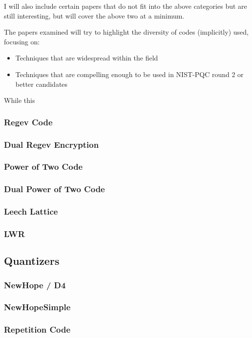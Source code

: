 \documentclass{article}
\begin{document}
I will also include certain papers that do not fit into the above categories but are still interesting, but will cover the above two at a minimum.



The papers examined will try to highlight the diversity of codes (implicitly) used, focusing on:
\begin{itemize}
	\item Techniques that are widespread within the field
	\item Techniques that are compelling enough to be used in NIST-PQC round 2 or better candidates
\end{itemize}
While this 


\subsubsection{Regev Code}
\subsubsection{Dual Regev Encryption}
\subsubsection{Power of Two Code}
\subsubsection{Dual Power of Two Code}
\subsubsection{Leech Lattice}
\subsubsection{LWR}


\subsection{Quantizers}
\subsubsection{NewHope / D4}
\subsubsection{NewHopeSimple}
\subsubsection{Repetition Code}
\end{document}
